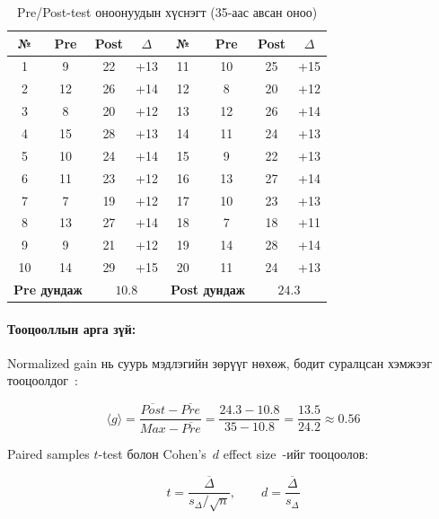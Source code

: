 \begin{table}[H]
\centering
\caption{Pre/Post-test оноонуудын хүснэгт (35-аас авсан оноо)}
\label{tab:prepost-raw}
\footnotesize
\begin{tabular}{|c|c|c|c||c|c|c|c|}
\hline
\textbf{№} & \textbf{Pre} & \textbf{Post} & $\Delta$ & \textbf{№} & \textbf{Pre} & \textbf{Post} & $\Delta$ \\
\hline
1 & 9  & 22 & +13 & 11 & 10 & 25 & +15 \\
2 & 12 & 26 & +14 & 12 & 8  & 20 & +12 \\
3 & 8  & 20 & +12 & 13 & 12 & 26 & +14 \\
4 & 15 & 28 & +13 & 14 & 11 & 24 & +13 \\
5 & 10 & 24 & +14 & 15 & 9  & 22 & +13 \\
6 & 11 & 23 & +12 & 16 & 13 & 27 & +14 \\
7 & 7  & 19 & +12 & 17 & 10 & 23 & +13 \\
8 & 13 & 27 & +14 & 18 & 7  & 18 & +11 \\
9 & 9  & 21 & +12 & 19 & 14 & 28 & +14 \\
10 & 14 & 29 & +15 & 20 & 11 & 24 & +13 \\
\hline
\multicolumn{2}{|c|}{\textbf{Pre дундаж}} & \multicolumn{2}{c||}{$10.8$} &
\multicolumn{2}{c|}{\textbf{Post дундаж}} & \multicolumn{2}{c|}{$24.3$} \\
\hline
\end{tabular}
\end{table}

\paragraph{Тооцооллын арга зүй:}

Normalized gain нь суурь мэдлэгийн зөрүүг нөхөж, бодит суралцсан хэмжээг тооцоолдог~\cite{hake1998interactive}:

\begin{equation}
\langle g \rangle = \frac{\overline{Post} - \overline{Pre}}{Max - \overline{Pre}} = \frac{24.3 - 10.8}{35 - 10.8} = \frac{13.5}{24.2} \approx 0.56
\end{equation}

Paired samples $t$-test болон Cohen's~$d$ effect size~\cite{cohen1988statistical}-ийг тооцоолов:

\begin{equation}
t = \frac{\overline{\Delta}}{s_{\Delta}/\sqrt{n}}, \qquad d = \frac{\overline{\Delta}}{s_{\Delta}}
\end{equation}

